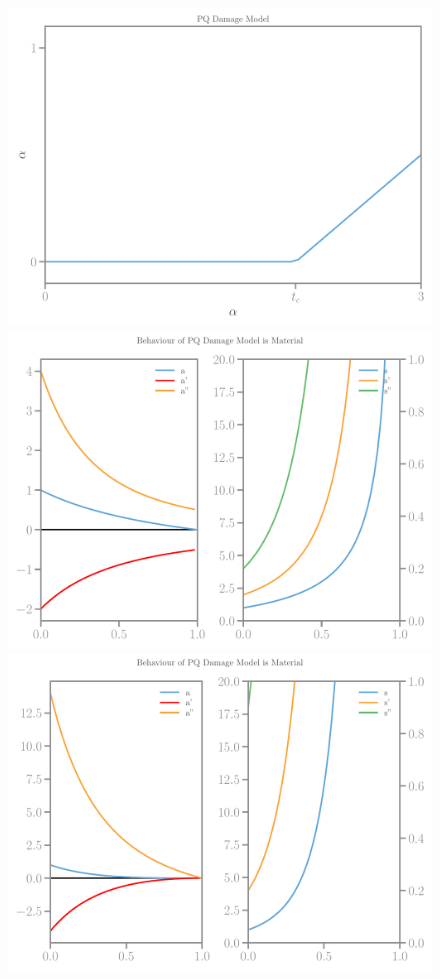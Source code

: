 \documentclass[]{article}
\begin{document}
\begin{figure}[htbp]
  \centering
  \includegraphics[width=.33\textheight]{../figures/pq-alpha-homog.pdf}
  \includegraphics[width=.33\textheight]{../figures/pq-11-model.pdf}
  \includegraphics[width=.33\textheight]{../figures/pq-13-model.pdf}

\end{figure}
\end{document}
